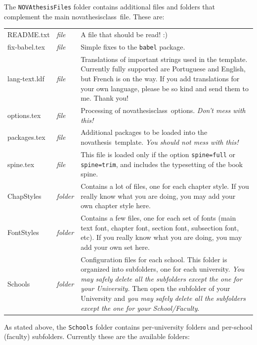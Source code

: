 The \texttt{NOVAthesisFiles} folder contains additional files and folders that complement the main \gls{novathesisclass}\ file.  These are:

\noindent
\bgroup
{}
\begin{tabularx}{\linewidth}{>{\ttfamily}l>{\itshape}l>{\upshape}X}
README.txt      & file    &
A file that should be read!  :)
\\
fix-babel.tex   & file    &
Simple fixes to the \texttt{babel} package.
\\
lang-text.ldf   & file    &
Translations of important strings used in the template.  Currently fully supported are Portuguese and English, but French is on the way.  If you add translations for your own language, please be so kind and send them to me. Thank you!
\\
options.tex     & file    &
Processing of \gls{novathesisclass}\ options.  \emph{Don't mess with this!}
\\
packages.tex    & file    &
Additional packages to be loaded into the \gls{novathesis}\ template. \emph{You should not mess with this!}
\\
spine.tex       & file    &
This file is loaded only if the option \texttt{spine=full} or \texttt{spine=trim}, and includes the typesetting of the book spine.
\\
ChapStyles      & folder  &
Contains a lot of files, one for each chapter style.  If you really know what you are doing, you may add your own chapter style here.
\\
FontStyles      & folder  &
Contains a few files, one for each set of fonts (main text font, chapter font, section font, subsection font, etc).  If you really know what you are doing, you may add your own set here.
\\
Schools         & folder  &
Configuration files for each school.  This folder is organized into subfolders, one for each university.  \emph{You may safely delete all the subfolders except the one for your University.}  Then open the subfolder of your University and \emph{you may safely delete all the subfolders except the one for your School/Faculty}.
\\
\end{tabularx}
\egroup

As stated above, the \texttt{Schools} folder contains per-university folders and per-school (faculty) subfolders.  Currently these are the available folders:

